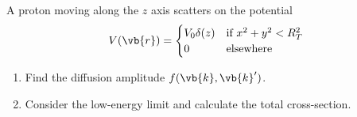 \begin{esercizio}
   A proton moving along the $z$ axis scatters on the potential
   \begin{equation*}
      V(\vb{r})=
      \begin{cases}
         V_0 \delta(z) & \text{if } x^2 + y^2 < R_T^2\\
         0 & \text{elsewhere}
      \end{cases}
   \end{equation*}
   \begin{enumerate}[label=\alph*), leftmargin=0.6cm]
      \item Find the diffusion amplitude $f(\vb{k},\vb{k}')$.
      \item Consider the low-energy limit and calculate the total cross-section.
   \end{enumerate}
\end{esercizio}
